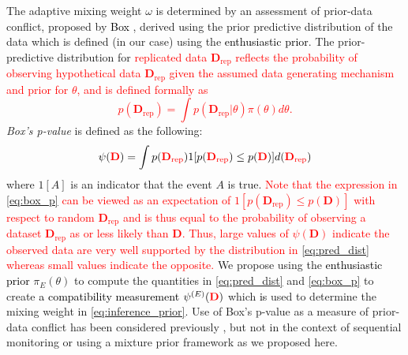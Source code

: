 \documentclass[12pt]{article}
\begin{document}
The adaptive mixing weight $\omega$ is determined by an assessment of prior-data conflict, proposed by \textcolor{black}{Box} \citep{Box1980}, derived using the prior predictive distribution of 
the data which is defined (in our case) using the \textcolor{black}{enthusiastic prior}.
The prior-predictive distribution for \textcolor{red}{replicated data $\mathbf{D}_{\text{rep}}$ reflects the probability of observing hypothetical data $\mathbf{D}_{\text{rep}}$ given 
the assumed data generating mechanism and prior for $\theta$, and is defined formally as
\begin{equation}\label{eq:pred_dist}
p(\mathbf{D}_{\text{rep}}) =\int p(\mathbf{D}_{\text{rep}}|\theta)\pi(\theta)d\theta.
\end{equation}}
\textit{Box's p-value} is defined as the following:
\begin{equation}\label{eq:box_p}
\psi({\textcolor{red}{\mathbf{D}}})=\int {p(\textcolor{red}{\mathbf{D}_{\text{rep}}})}  1[p(\textcolor{red}{\mathbf{D}_{\text{rep}}})\leq p(\textcolor{red}{\mathbf{D}})] d(\textcolor{red}{\mathbf{D}_{\text{rep}}})
\end{equation}
%
where $1[A]$ is an indicator that the event $A$ is true.
%
\textcolor{red}{Note that the expression in \eqref{eq:box_p} can be viewed as an expectation of $1[p(\mathbf{D}_{\text{rep}})\leq p(\mathbf{D})]$ with respect to random $\mathbf{D}_{\text{rep}}$ and is thus equal to the probability of observing a dataset $\mathbf{D}_{\text{rep}}$ as or less likely than $\mathbf{D}$. Thus, large values of $\psi({\mathbf{D}})$ indicate the observed data are very well supported by the distribution in \eqref{eq:pred_dist} whereas small values indicate the opposite. 
}
%
%
We propose using the \textcolor{black}{enthusiastic prior} $\pi_E(\theta)$ to compute the quantities in \eqref{eq:pred_dist} and \eqref{eq:box_p} to create \textcolor{black}{a compatibility measurement} $\psi^{(E)}(\textcolor{red}{\mathbf{D}})$ which \textcolor{black}{is} used to determine the mixing weight in \eqref{eq:inference_prior}. Use of Box's p-value as a measure of prior-data conflict has been considered previously \citep{PsiodaXue2020}, but not in the context of sequential monitoring or using a mixture prior framework as we proposed here.
\end{document}
